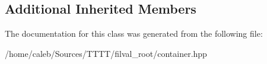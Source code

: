 \subsection*{Additional Inherited Members}


The documentation for this class was generated from the following file\+:\begin{DoxyCompactItemize}
\item 
/home/caleb/\+Sources/\+T\+T\+T\+T/filval\+\_\+root/container.\+hpp\end{DoxyCompactItemize}

